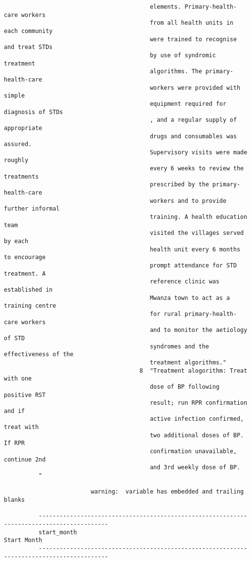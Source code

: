 \documentclass{article}
\begin{document}
\begin{verbatim}
                                          elements. Primary-health-care workers
                                          from all health units in each community
                                          were trained to recognise and treat STDs
                                          by use of syndromic treatment
                                          algorithms. The primary-health-care
                                          workers were provided with simple
                                          equipment required for diagnosis of STDs
                                          , and a regular supply of appropriate
                                          drugs and consumables was assured.
                                          Supervisory visits were made roughly
                                          every 6 weeks to review the treatments
                                          prescribed by the primary-health-care
                                          workers and to provide further informal
                                          training. A health education team
                                          visited the villages served by each
                                          health unit every 6 months to encourage
                                          prompt attendance for STD treatment. A
                                          reference clinic was established in
                                          Mwanza town to act as a training centre
                                          for rural primary-health-care workers
                                          and to monitor the aetiology of STD
                                          syndromes and the effectiveness of the
                                          treatment algorithms."
                                       8  "Treatment alogorithm: Treat with one
                                          dose of BP following positive RST
                                          result; run RPR confirmation and if
                                          active infection confirmed, treat with
                                          two additional doses of BP. If RPR
                                          confirmation unavailable, continue 2nd
                                          and 3rd weekly dose of BP.
          "
          
                         warning:  variable has embedded and trailing blanks
          
          ------------------------------------------------------------------------------------------
          start_month                                                                    Start Month
          ------------------------------------------------------------------------------------------
          

\end{verbatim}
\end{document}
